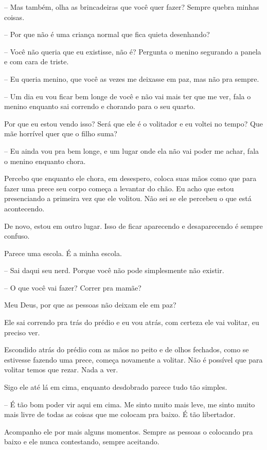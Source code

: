 -- Mas também, olha as brincadeiras que você quer fazer? Sempre quebra minhas coisas.

-- Por que não é uma criança normal que fica quieta desenhando?

-- Você não queria que eu existisse, não é? Pergunta o menino segurando a panela e com cara de triste.

-- Eu queria menino, que você as vezes me deixasse em paz, mas não pra sempre.

-- Um dia eu vou ficar bem longe de você e não vai mais ter que me ver, fala o menino enquanto sai correndo e chorando para o seu quarto.

Por que eu estou vendo isso? Será que ele é o volitador e eu voltei no tempo? Que mãe horrível quer que o filho suma?

-- Eu ainda vou pra bem longe, e um lugar onde ela não vai poder me achar, fala o menino enquanto chora.

Percebo que enquanto ele chora, em desespero, coloca suas mãos como que para fazer uma prece seu corpo começa a levantar do chão. Eu acho que estou presenciando a primeira vez que ele volitou. Não sei se ele percebeu o que está acontecendo.

De novo, estou em outro lugar. Isso de ficar aparecendo e desaparecendo é sempre confuso.

Parece uma escola. É a minha escola.

-- Sai daqui seu nerd. Porque você não pode simplesmente não existir.

-- O que você vai fazer? Correr pra mamãe?

Meu Deus, por que as pessoas não deixam ele em paz?

Ele sai correndo pra trás do prédio e eu vou atrás, com certeza ele vai volitar, eu preciso ver.

Escondido atrás do prédio com as mãos no peito e de olhos fechados, como se estivesse fazendo uma prece, começa novamente a volitar. Não é possível que para volitar temos que rezar. Nada a ver.

Sigo ele até lá em cima, enquanto desdobrado parece tudo tão simples.

-- É tão bom poder vir aqui em cima. Me sinto muito mais leve, me sinto muito mais livre de todas as coisas que me colocam pra baixo. É tão libertador.

Acompanho ele por mais alguns momentos. Sempre as pessoas o colocando pra baixo e ele nunca contestando, sempre aceitando.

